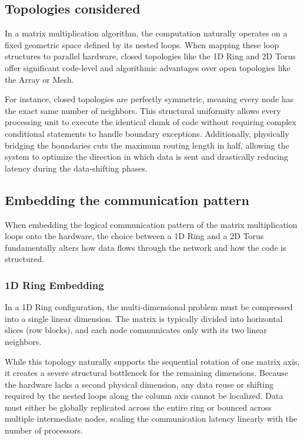 \documentclass[
  12pt,
]{article}
\begin{document}
\subsection{Topologies considered}\label{topologies-considered}

In a matrix multiplication algorithm, the computation naturally operates
on a fixed geometric space defined by its nested loops. When mapping
these loop structures to parallel hardware, closed topologies like the
1D Ring and 2D Torus offer significant code-level and algorithmic
advantages over open topologies like the Array or Mesh.

For instance, closed topologies are perfectly symmetric, meaning every
node has the exact same number of neighbors. This structural uniformity
allows every processing unit to execute the identical chunk of code
without requiring complex conditional statements to handle boundary
exceptions. Additionally, physically bridging the boundaries cuts the
maximum routing length in half, allowing the system to optimize the
direction in which data is sent and drastically reducing latency during
the data-shifting phases.

\subsection{Embedding the communication
pattern}\label{embedding-the-communication-pattern}

When embedding the logical communication pattern of the matrix
multiplication loops onto the hardware, the choice between a 1D Ring and
a 2D Torus fundamentally alters how data flows through the network and
how the code is structured.

\subsubsection{1D Ring Embedding}\label{d-ring-embedding}

In a 1D Ring configuration, the multi-dimensional problem must be
compressed into a single linear dimension. The matrix is typically
divided into horizontal slices (row blocks), and each node communicates
only with its two linear neighbors.

While this topology naturally supports the sequential rotation of one
matrix axis, it creates a severe structural bottleneck for the remaining
dimensions. Because the hardware lacks a second physical dimension, any
data reuse or shifting required by the nested loops along the column
axis cannot be localized. Data must either be globally replicated across
the entire ring or bounced across multiple intermediate nodes, scaling
the communication latency linearly with the number of processors.
\end{document}
